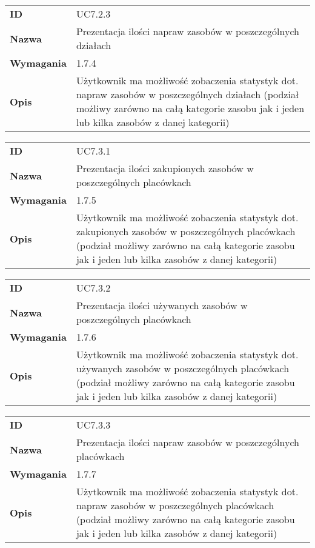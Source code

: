 \vspace{.05\textheight}

\begin{tabular}{p{}p{}}
\hfill {\bf ID} & UC7.2.3 \\
\hfill {\bf Nazwa} &  Prezentacja ilości napraw zasobów w poszczególnych działach \\
\hfill {\bf Wymagania} & 1.7.4 \\
\hfill {\bf Opis} &  Użytkownik ma możliwość zobaczenia statystyk dot. napraw zasobów w poszczególnych działach (podział możliwy zarówno na całą kategorie zasobu jak i jeden lub kilka zasobów z danej kategorii) \\
\end{tabular}

\vspace{.05\textheight}

\begin{tabular}{p{}p{}}
\hfill {\bf ID} & UC7.3.1 \\
\hfill {\bf Nazwa} & Prezentacja ilości zakupionych zasobów w poszczególnych placówkach \\
\hfill {\bf Wymagania} & 1.7.5 \\
\hfill {\bf Opis} & Użytkownik ma możliwość zobaczenia statystyk dot. zakupionych zasobów w poszczególnych placówkach (podział możliwy zarówno na całą kategorie zasobu jak i jeden lub kilka zasobów z danej kategorii) \\
\end{tabular}

\vspace{.05\textheight}

\begin{tabular}{p{}p{}}
\hfill {\bf ID} & UC7.3.2 \\
\hfill {\bf Nazwa} &  Prezentacja ilości używanych zasobów w poszczególnych placówkach \\
\hfill {\bf Wymagania} & 1.7.6  \\
\hfill {\bf Opis} &  Użytkownik ma możliwość zobaczenia statystyk dot. używanych zasobów w poszczególnych placówkach (podział możliwy zarówno na całą kategorie zasobu jak i jeden lub kilka zasobów z danej kategorii) \\
\end{tabular}

\vspace{.05\textheight}

\begin{tabular}{p{}p{}}
\hfill {\bf ID} & UC7.3.3 \\
\hfill {\bf Nazwa} & Prezentacja ilości napraw zasobów w poszczególnych placówkach \\
\hfill {\bf Wymagania} & 1.7.7 \\
\hfill {\bf Opis} &  Użytkownik ma możliwość zobaczenia statystyk dot. napraw zasobów w poszczególnych placówkach (podział możliwy zarówno na całą kategorie zasobu jak i jeden lub kilka zasobów z danej kategorii) \\
\end{tabular}

